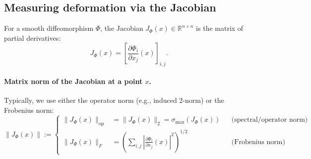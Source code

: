 \documentclass{article}
\theoremstyle{definition} \newtheorem{definition}{Definition}  \newtheorem{example}{Example}
\theoremstyle{remark} \newtheorem{remark}{Remark}
\newcounter{ct}
\newcommand{\Diff}{\operatorname{Diff}}
\begin{document}
%
%
%


\subsection{Measuring deformation via the Jacobian}\label{eq:jacobian_norm}
 For a smooth diffeomorphism \( \Phi \), the Jacobian \( J_{\Phi}(x) \in \mathbb{R}^{n \times n} \) is the matrix of partial derivatives:
\[
J_{\Phi}(x) = \left[ \frac{\partial \Phi_i}{\partial x_j}(x) \right]_{i,j}.
\]

\paragraph{Matrix norm of the Jacobian at a point \( x \).} Typically, we use either the operator norm (e.g., induced 2-norm) or the Frobenius norm:
\begin{equation}
\|J_{\Phi}(x)\| :=
\left\{
\begin{aligned}
\|J_{\Phi}(x)\|_{\mathrm{op}} &= \|J_{\Phi}(x)\|_2 = \sigma_{\max}(J_{\Phi}(x)) && \text{(spectral/operator norm)} \\
\|J_{\Phi}(x)\|_F &= \left( \sum_{i,j} \left| \frac{\partial \Phi_i}{\partial x_j}(x) \right|^2 \right)^{1/2} && \text{(Frobenius norm)}
\end{aligned}
\right.
\end{equation}
\end{document}
